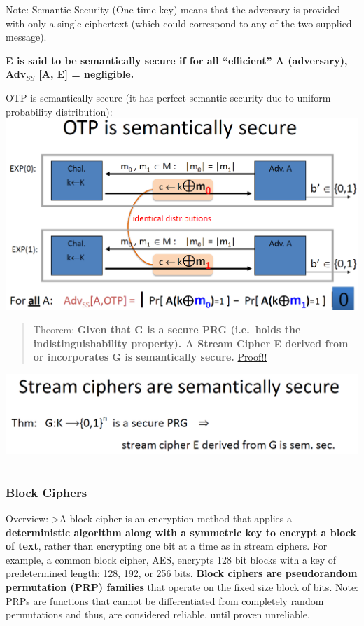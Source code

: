 \documentclass[11pt]{article}
\makeatletter
\def\maxwidth{\ifdim\Gin@nat@width>\linewidth\linewidth
    \else\Gin@nat@width\fi}
\let\Oldincludegraphics\includegraphics
\renewcommand{\includegraphics}[1]{\Oldincludegraphics[width=.8\maxwidth]{#1}}
\makeatother
\begin{document}
Note: Semantic Security (One time key) means that the adversary is
provided with only a single ciphertext (which could correspond to any of
the two supplied message).

\textbf{E is said to be semantically secure if for all ``efficient'' A
(adversary), Adv\(_{SS}\) {[}A, E{]} = negligible.}

OTP is semantically secure (it has perfect semantic security due to
uniform probability distribution):
\includegraphics{./Images/OTPSemantic.png}

\begin{quote}
Theorem: \textbf{Given that G is a secure PRG (i.e.~holds the
indistinguishability property). A Stream Cipher E derived from or
incorporates G is semantically secure.}
\href{https://www.coursera.org/learn/crypto/lecture/VeLNT/stream-ciphers-are-semantically-secure-optional}{Proof!!}
\end{quote}

\includegraphics{./Images/StreamSemantic.png}

\begin{center}\rule{0.5\linewidth}{\linethickness}\end{center}

    \hypertarget{block-ciphers}{%
\subsubsection{Block Ciphers}\label{block-ciphers}}

Overview: \textgreater{}A block cipher is an encryption method that
applies a \textbf{deterministic algorithm along with a symmetric key to
encrypt a block of text}, rather than encrypting one bit at a time as in
stream ciphers. For example, a common block cipher, AES, encrypts 128
bit blocks with a key of predetermined length: 128, 192, or 256 bits.
\textbf{Block ciphers are pseudorandom permutation (PRP) families} that
operate on the fixed size block of bits. Note: PRPs are functions that
cannot be differentiated from completely random permutations and thus,
are considered reliable, until proven unreliable.
\end{document}
